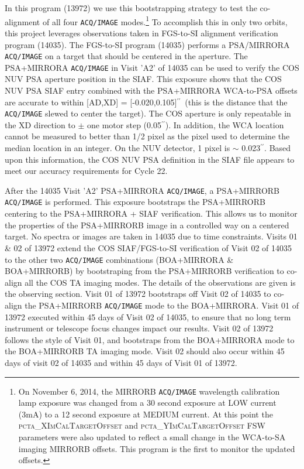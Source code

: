 \documentclass[12pt]{reportj}
\def\arcsec{\hbox{$^{\prime\prime}$}}
\begin{document}
In this program (13972) we use this bootstrapping strategy to test the co-alignment of all four \texttt{ACQ/IMAGE} modes.\footnote{On November 6, 2014,
the MIRRORB \texttt{ACQ/IMAGE} wavelength calibration lamp exposure was changed from a 30 second exposure
at LOW current (3mA) to a 12 second exposure at MEDIUM current. At this point the \textsc{pcta\_XImCalTargetOffset} and \textsc{pcta\_YImCalTargetOffset}
FSW parameters were also updated to reflect a small change in the WCA-to-SA imaging MIRRORB offsets. This program is the first
to monitor the updated offsets.}
To accomplish this in only two orbits, this project leverages observations taken in FGS-to-SI alignment verification
program (14035).
\clearpage
The FGS-to-SI program (14035) performs a PSA/MIRRORA \texttt{ACQ/IMAGE} on a target that should be centered in the aperture.
The PSA+MIRRORA \texttt{ACQ/IMAGE} in Visit 'A2' of 14035 can be used to verify the COS NUV PSA aperture position in the SIAF.
This exposure shows that the COS NUV PSA SIAF entry combined with the PSA+MIRRORA WCA-to-PSA offsets are
accurate to within [AD,XD] = [-0.020,0.105]\arcsec\ (this is the distance that the \texttt{ACQ/IMAGE} slewed to center the target).
The COS aperture is only repeatable in the XD direction to $\pm$ one motor step (0.05\arcsec). In addition, the WCA location
cannot be measured to better than 1/2 pixel as the pixel used to determine the median location in an integer.
On the NUV detector, 1 pixel is $\sim$ 0.023\arcsec. Based upon this information, the COS NUV PSA definition
in the SIAF file appears to meet our accuracy requirements for Cycle 22.

After the 14035 Visit 'A2' PSA+MIRRORA \texttt{ACQ/IMAGE}, a PSA+MIRRORB \texttt{ACQ/IMAGE} is performed.
This exposure bootstraps the PSA+MIRRORB centering to the PSA+MIRRORA + SIAF verification.
This allows us to monitor the properties of the PSA+MIRRORB image in a controlled way on a centered target. No spectra or images are taken in 14035 due to time constraints.
Visits 01 \& 02 of 13972 extend the COS SIAF/FGS-to-SI verification of Visit 02 of 14035 to the other two \texttt{ACQ/IMAGE} combinations (BOA+MIRRORA \& BOA+MIRRORB) by bootstraping from the PSA+MIRRORB verification to co-align all the COS TA imaging modes. The details of the observations are given is the observing section.
Visit 01 of 13972 bootstraps off Visit 02 of 14035 to co-align the PSA+MIRRORB \texttt{ACQ/IMAGE} mode to the BOA+MIRRORA. Visit 01 of 13972 executed within 45 days of Visit 02 of 14035, to ensure that no long term instrument or telescope focus changes impact our results.
Visit 02 of 13972 follows the style of Visit 01, and bootstraps from the BOA+MIRRORA mode to the BOA+MIRRORB TA imaging mode. Visit 02 should also occur within 45 days of visit 02 of 14035 and within 45 days of Visit 01 of 13972.
\end{document}
